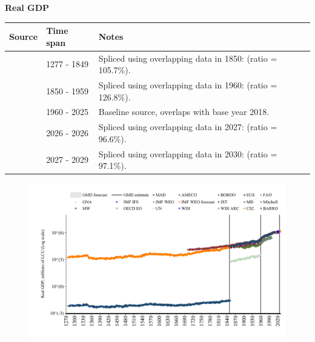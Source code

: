 \documentclass[12pt,a4paper,landscape]{article}
\begin{document}
\begin{adjustbox}{max totalsize={\paperwidth}{\paperheight},center}
\begin{minipage}[t][\textheight][t]{\textwidth}
\vspace*{0.5cm}
{}
\begin{center}
{\Large\bfseries Real GDP}
\end{center}
\vspace{0.5cm}
\begin{table}[H]
\centering
\small
\begin{tabular}{|l|l|l|}
\hline
\textbf{Source} & \textbf{Time span} & \textbf{Notes} \\
\hline
\rowcolor{white}\cite{CS2_ESP}& 1277 - 1849 &Spliced using overlapping data in 1850: (ratio = 105.7\%). \\
\rowcolor{lightgray}\cite{MW}& 1850 - 1959 &Spliced using overlapping data in 1960: (ratio = 126.8\%). \\
\rowcolor{white}\cite{OECD_EO}& 1960 - 2025 &Baseline source, overlaps with base year 2018. \\
\rowcolor{lightgray}\cite{AMECO}& 2026 - 2026 &Spliced using overlapping data in 2027: (ratio = 96.6\%). \\
\rowcolor{white}\cite{IMF_WEO_forecast}& 2027 - 2029 &Spliced using overlapping data in 2030: (ratio = 97.1\%). \\
\hline
\end{tabular}
\end{table}
\begin{figure}[H]
\centering
\includegraphics[width=\textwidth,height=0.6\textheight,keepaspectratio]{graphs/ESP_rGDP.pdf}
\end{figure}
\end{minipage}
\end{adjustbox}
\end{document}

